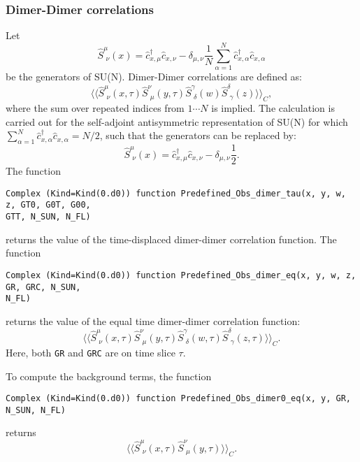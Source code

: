 \subsubsection{Dimer-Dimer correlations }
Let  
\begin{equation}
\hat{S}^{\mu}_{\, \,  \nu} (x)  =  \hat{c}^{\dagger}_{x,\mu} \hat{c}^{}_{x,\nu}    - \delta_{\mu,\nu} \frac{1}{N}  \sum_{\alpha = 1}^{N} \hat{c}^{\dagger}_{x,\alpha} \hat{c}^{}_{x,\alpha}
\end{equation}
be the generators of SU(N). 
Dimer-Dimer correlations are defined  as: 
\begin{equation}
\langle \langle \hat{S}^{\mu}_{\, \,  \nu} (x,\tau)   \hat{S}^{\nu}_{\, \,  \mu} (y,\tau) 
\hat{S}^{\gamma}_{\, \,  \delta} (w)   \hat{S}^{\delta}_{\, \,  \gamma} (z)   \rangle   \rangle_C  ,
\end{equation}
where the sum   over repeated indices   from $ 1 \cdots N $ is implied. 
The calculation is carried out  for the self-adjoint antisymmetric  representation of SU(N)   for which $ \sum_{\alpha = 1}^{N} \hat{c}^{\dagger}_{x,\alpha} \hat{c}^{}_{x,\alpha}  = N/2$,   such that the generators can be replaced by: 
\begin{equation}
\hat{S}^{\mu}_{\, \,  \nu} (x)  =  \hat{c}^{\dagger}_{x,\mu} \hat{c}^{}_{x,\nu}    - \delta_{\mu,\nu} \frac{1}{2}. 
\end{equation}
The  function 
\begin{lstlisting}[style=fortran]
Complex (Kind=Kind(0.d0)) function Predefined_Obs_dimer_tau(x, y, w, z, GT0, G0T, G00,
GTT, N_SUN, N_FL)  
\end{lstlisting}
returns the   value of the time-displaced dimer-dimer correlation function. 
The  function 
\begin{lstlisting}[style=fortran]
Complex (Kind=Kind(0.d0)) function Predefined_Obs_dimer_eq(x, y, w, z, GR, GRC, N_SUN,
N_FL)
\end{lstlisting}
returns the   value of the equal time  dimer-dimer correlation function:
\begin{equation}
\langle \langle \hat{S}^{\mu}_{\, \,  \nu} (x,\tau)   \hat{S}^{\nu}_{\, \,  \mu} (y,\tau) 
\hat{S}^{\gamma}_{\, \,  \delta} (w,\tau)   \hat{S}^{\delta}_{\, \,  \gamma} (z,\tau)   \rangle   \rangle_C.  
\end{equation}
Here,  both \texttt{GR}  and  \texttt{GRC}  are on time slice  $\tau$.

To compute the background terms, the function
\begin{lstlisting}[style=fortran]
Complex (Kind=Kind(0.d0)) function Predefined_Obs_dimer0_eq(x, y, GR, N_SUN, N_FL)
\end{lstlisting}
returns 
\begin{equation}
\langle \langle \hat{S}^{\mu}_{\, \,  \nu} (x,\tau)   \hat{S}^{\nu}_{\, \,  \mu} (y,\tau)  \rangle   \rangle_C .
\end{equation} 

